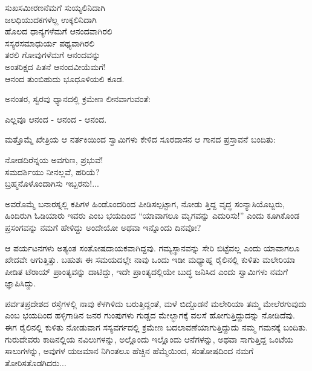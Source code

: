 \begin{myquote}
ಸುಖಸಮೀರಣನೆಮಗೆ ಸುಯ್ಯಲಿನಿದಾಗಿ\\ಜಲಧಿಯುದಕಗಳೆಲ್ಲ ಉಕ್ಕಲಿನಿದಾಗಿ\\ಹೊಲದ ಧಾನ್ಯಗಳೆಮಗೆ ಆನಂದವಾಗಿರಲಿ\\ಸಸ್ಯರಸಮಾಧುರ್ಯ ಪಥ್ಯವಾಗಿರಲಿ\\ತರಲಿ ಗೋವುಗಳೆಮಗೆ ಆನಂದವನ್ನು\\ಅಂತರಿಕ್ಷದ ಪಿತನೆ ಆನಂದವೀಯೆಮಗೆ!\\ಆನಂದ ತುಂಬಿಹುದು ಭೂಧೂಳಿಯಲಿ ಕೂಡ.
\end{myquote}

ಅನಂತರ, ಸ್ವರವು ಧ್ಯಾನದಲ್ಲಿ ಕ್ರಮೇಣ ಲೀನವಾಗುವಂತೆ:

\begin{myquote}
ಎಲ್ಲವೂ ಆನಂದ - ಆನಂದ - ಆನಂದ.
\end{myquote}

ಮತ್ತೊಮ್ಮೆ ಖೇತ್ರಿಯ ಆ ನರ್ತಕಿಯಿಂದ ಸ್ವಾಮಿಗಳು ಕೇಳಿದ ಸೂರದಾಸನ ಆ ಗಾನದ ಪ್ರಸ್ತಾವನೆ ಬಂದಿತು:

\begin{myquote}
ನೋಡದಿರೆನ್ನಯ ಅವಗುಣ, ಪ್ರಭುವೆ!\\ಸಮದರ್ಶಿಯು ನೀನಲ್ಲವೆ, ಹರಿಯೆ?\\ಬ್ರಹ್ಮನೊಳೊಂದಾಗಿಸು ಇಬ್ಬರನು!...
\end{myquote}

ಅವರೊಮ್ಮೆ ಬನಾರಸ್ನಲ್ಲಿ ಕಪಿಗಳ ಹಿಂಡೊಂದರಿಂದ ಪೀಡಿಸಲ್ಪಟ್ಟಾಗ, ನೋಡು ತ್ತಿದ್ದ ವೃದ್ಧ ಸಂನ್ಯಾಸಿಯೊಬ್ಬರು, ಹಿಂದಿರುಗಿ ಓಡಿಯಾರು ಇವರು ಎಂಬ ಭಯದಿಂದ “ಯಾವಾಗಲೂ ಮೃಗವನ್ನು ಎದುರಿಸು!” ಎಂದು ಕೂಗಿಕೊಂಡ ಪ್ರಸಂಗವನ್ನು ನಮಗೆ ಹೇಳಿದ್ದು ಅಂದೇಯೋ ಅಥವಾ ಇನ್ನೊಂದು ದಿನವೋ?

ಆ ಪರ್ಯಟನಗಳು ಅತ್ಯಂತ ಸಂತೋಷದಾಯಕವಾಗಿದ್ದವು. ಗಮ್ಯಸ್ಥಾನವನ್ನು ಸೇರಿ ಬಿಟ್ಟೆವಲ್ಲ ಎಂದು ಯಾವಾಗಲೂ ಖೇದವೇ ಆಗುತ್ತಿತ್ತು. ಬಹುಶಃ ಈ ಸಮಯದಲ್ಲೇ ನಾವು ಒಂದು ಇಡೀ ಮಧ್ಯಾಹ್ನ ರೈಲಿನಲ್ಲಿ ಕುಳಿತು ಮಲೇರಿಯಾ ಪೀಡಿತ ಟೆರಾಯ್​ ಪ್ರಾಂತ್ಯವನ್ನು ದಾಟಿದ್ದು, ಇದೇ ಪ್ರಾಂತ್ಯದಲ್ಲಿಯೇ ಬುದ್ಧ ಜನಿಸಿದ ಎಂದು ಸ್ವಾಮಿಗಳು ನಮಗೆ ಜ್ಞಾಪಿಸಿದ್ದು.

ಪರ್ವತಪ್ರದೇಶದ ರಸ್ತೆಗಳಲ್ಲಿ ನಾವು ಕೆಳಗಿಳಿದು ಬರುತ್ತಿದ್ದಂತೆ, ಮಳೆ ಬಿದ್ದೊಡನೆ ಮಲೇರಿಯಾ ತಮ್ಮ ಮೇಲೆರಗುವುದು ಎಂಬ ಭಯದಿಂದ ಹಳ್ಳಿಗಾಡಿನ ಜನರ ಗುಂಪುಗಳು ಗುಡ್ಡದ ಮೇಲ್ಭಾಗಕ್ಕೆ ವಲಸೆ ಹೋಗುತ್ತಿದ್ದುದನ್ನು ನೋಡಿದೆವು. ಈಗ ರೈಲಿನಲ್ಲಿ ಕುಳಿತು ನೋಡುವಾಗ ಸಸ್ಯವರ್ಗದಲ್ಲಿ ಕ್ರಮೇಣ ಬದಲಾವಣೆಯಾಗುತ್ತಿದ್ದುದು ನಮ್ಮ ಗಮನಕ್ಕೆ ಬಂದಿತು. ಗುರುದೇವರು ಕಾಡಿನಲ್ಲಿಯ ನವಿಲುಗಳನ್ನು, ಅಲ್ಲೊಂದು ಇಲ್ಲೊಂದು ಆನೆಗಳನ್ನು, ಅಥವಾ ಸಾಗುತ್ತಿದ್ದ ಒಂಟೆಯ ಸಾಲುಗಳನ್ನು, ಅವುಗಳ ಯಜಮಾನ ನಿಗಿಂತಲೂ ಹೆಚ್ಚಿನ ಹೆಮ್ಮೆಯಿಂದ, ಸಂತೋಷದಿಂದ ನಮಗೆ ತೋರಿಸತೊಡಗಿದರು...

